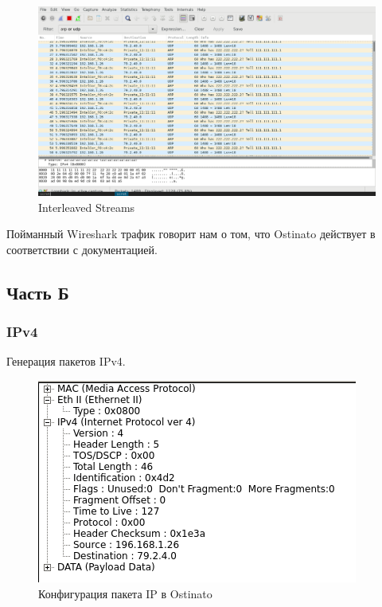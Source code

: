 \documentclass[12pt, a4paper] {ncc}
\begin{document}
	\begin{figure}[h!]
		\includegraphics[scale=0.4]{Interleave.png}
		\caption{Interleaved Streams}
		\center
	\end{figure}

	Пойманный Wireshark трафик говорит нам о том, что Ostinato действует в соответствии с
	документацией.

\subsection*{Часть Б}

\subsubsection*{IPv4}
	
	Генерация пакетов IPv4.

	\begin{figure}[h!]
		\includegraphics[scale=0.5]{IPStream_without_frag.png}
		\caption{Конфигурация пакета IP в Ostinato}
		\center
	\end{figure}
\end{document}
